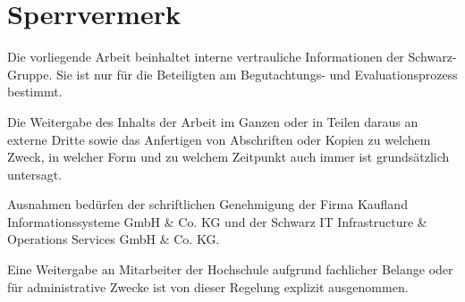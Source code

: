\chapter*{Sperrvermerk}
Die vorliegende Arbeit beinhaltet interne vertrauliche Informationen der Schwarz-Gruppe. Sie ist nur für die Beteiligten am Begutachtungs- und Evaluationsprozess bestimmt.

Die Weitergabe des Inhalts der Arbeit im Ganzen oder in Teilen daraus an externe Dritte sowie das Anfertigen von Abschriften oder Kopien zu welchem Zweck, in welcher Form und zu welchem Zeitpunkt auch immer ist grundsätzlich untersagt.

Ausnahmen bedürfen der schriftlichen Genehmigung der Firma Kaufland Informationssysteme GmbH \& Co. KG und der Schwarz IT Infrastructure \& Operations Services GmbH \& Co. KG.

Eine Weitergabe an Mitarbeiter der Hochschule aufgrund fachlicher Belange oder für administrative Zwecke ist von dieser Regelung explizit ausgenommen.